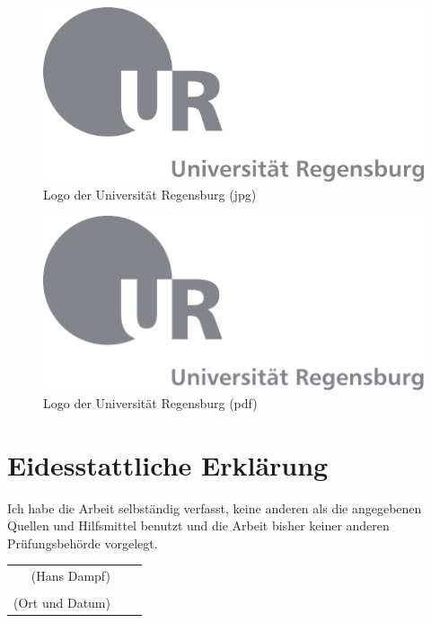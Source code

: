 \documentclass[12pt,ngerman,a4paper,DIV=9,headinclude=true,footinclude=false,titlepage=true,headsepline=true,toc=bibliography,toc=listof]{scrartcl}
\makeatletter
\newif \if@mainmatter \@mainmattertrue
\newcommand*\backmatter{\clearpage\thispagestyle{plain}\@mainmatterfalse}
\makeatother
\begin{document}
\begin{figure}[htbp]
\centering
\includegraphics{Bilder/ur-logo.jpg}
\caption{Logo der Universität Regensburg (jpg)}
\end{figure}

\begin{figure}[htbp]
\centering
\includegraphics{Bilder/ur-logo.pdf}
\caption{Logo der Universität Regensburg (pdf)}
\end{figure}


\backmatter
\printbibheading[title={Quellen}]

\printbibliography[notkeyword=film,heading=subbibintoc,title={Literaturverzeichnis}]

\printbibliography[keyword=film,heading=subbibintoc,title={Filmverzeichnis}]


\clearpage
\thispagestyle{plain}
\markboth{}{}
\section*{Eidesstattliche Erklärung}


Ich habe die Arbeit selbständig verfasst, keine anderen als die angegebenen 
Quellen und Hilfsmittel benutzt und die Arbeit bisher keiner anderen
Prüfungsbehörde vorgelegt.

\vspace{1cm}

  \begin{center}
  \begin{tabular}{ r c l }
  (Hans Dampf)         &  & \dotfill                                     \\
                     &  & \parbox[t]{8cm}{\strut}                      \\
  (Ort und Datum)    &  & \dotfill                                     \\
  \end{tabular}
  \end{center}
\end{document}
